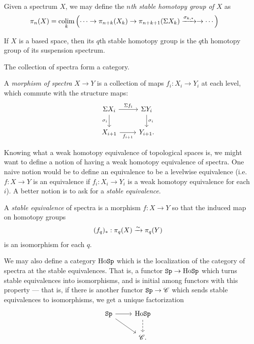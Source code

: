 \documentclass{article}[11pt]
\begin{document}
\begin{definition} Given a spectrum $X$, we may define the \textit{$n$th stable homotopy group of $X$} as
\begin{align*}
	\pi_n(X) &= \mathop{\operatorname*{colim}}_k \left( \cdots \to \pi_{n+k}(X_k) \to \pi_{n+k+1}(\Sigma X_k) \xrightarrow{\sigma_{k,\ast}} \to \cdots \right)
\end{align*}
\end{definition}

\begin{exercise} If $X$ is a based space, then its $q$th stable homotopy group is the $q$th homotopy group of its suspension spectrum.
\end{exercise}


The collection of spectra form a category.

\begin{definition} A \textit{morphism of spectra} $X\to Y$ is a collection of maps $f_i : X_i \to Y_i$ at each level, which commute with the structure maps:
\[
	\begin{tikzcd}
	\Sigma X_i \rar["\Sigma f_i"]\dar["\sigma_i" left] & \Sigma Y_i \dar["\sigma_i" right] \\
	X_{i+1}\rar["f_{i+1}" below] & Y_{i+1}.
	\end{tikzcd}
\]
\end{definition}

Knowing what a weak homotopy equivalence of topological spaces is, we might want to define a notion of having a weak homotopy equivalence of spectra. One naive notion would be to define an equivalence to be a levelwise equivalence (i.e. $f: X \to Y$ is an equivalence if $f_i : X_i \to Y_i$ is a weak homotopy equivalence for each $i$). A better notion is to ask for a \textit{stable equivalence}.

\begin{definition} A \textit{stable equivalence} of spectra is a morphism $f: X \to Y$ so that the induced map on homotopy groups
\begin{align*}
    (f_q)_\ast : \pi_q(X) \xrightarrow{\sim} \pi_q(Y)
\end{align*}
is an isomorphism for each $q$.
\end{definition}

We may also define a category $\text{Ho}\texttt{Sp}$ which is the localization of the category of spectra at the stable equivalences. That is, a functor $\texttt{Sp} \to \text{Ho}\texttt{Sp}$ which turns stable equivalences into isomorphisms, and is initial among functors with this property --- that is, if there is another functor $\texttt{Sp} \to \mathscr{C}$ which sends stable equivalences to isomorphisms, we get a unique factorization
\[
	\begin{tikzcd}
	\Sp\rar\ar[dr] & \Ho\Sp\dar[dashed] \\
	 & \mathscr{C}.
	\end{tikzcd}
\]
\end{document}
